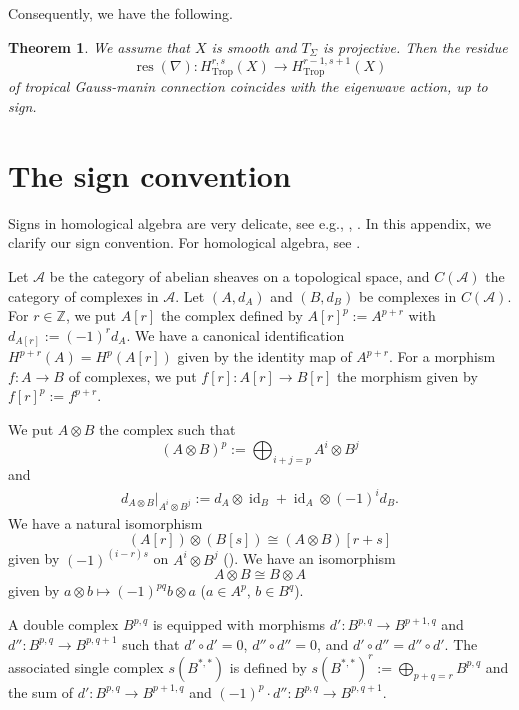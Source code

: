 \documentclass[12pt,a4]{amsart}
\newtheorem{thm}{Theorem}[section]
\def\Z{\mathbb{Z}}
\def\res{\mathop{\mathrm{res}}\nolimits}
\def\Trop{\mathop{\mathrm{trop}}\nolimits}
\def\id{\mathop{\mathrm{id}}\nolimits}
\def\Trop{\mathop{\mathrm{Trop}}\nolimits}
\numberwithin{equation}{section}
\numberwithin{figure}{section}
\begin{document}
   Consequently, we have the following.
  \begin{thm}\label{eigenwave is residue of GM connections:label}
   We assume that $X$ is smooth and $T_{\Sigma}$ is projective.
   Then the residue 
   $$ \res (\nabla)  
      \colon 
     H^{r,s}_{\Trop} ( X)
      \to   
      H^{r-1,s+1}_{\Trop} ( X) 
   $$
    of tropical Gauss-manin connection
   coincides with the eigenwave action, up to sign.
  \end{thm}


\appendix
\section{The sign convention} \label{sec:sign_convention}
   Signs in homological algebra are very delicate, see e.g.,  
   \cite{ConradGrothendieckDualityandBaseChange2000},
    \cite{LawsonInwhichItrytogetthesignsrightforonce2013}. 
   In this appendix, 
   we clarify our sign convention.
   For homological algebra, see \cite{WeibelAnintroductiontohomologicalalgebra1984}. 
   
  Let $\mathscr{A}$ be the category of abelian sheaves on a topological space,
   and $C(\mathscr{A})$ the category of complexes in $\mathscr{A}$.
  Let $(A,d_A)$ and $(B,d_B)$ be complexes in $C(\mathscr{A})$.
  For  $r \in \Z$,
   we put $A[r]$ the complex defined by
   $A[r]^p:= A^{p+r}$ with $d_{A[r]} := (-1)^{r} d_A$.
  We have a canonical identification $H^{p+r}(A) = H^{p}(A[r])$ 
   given by the identity map of $A^{p+r}$.
  For a morphism $f \colon A \to B$ of complexes, 
   we put  $f[r] \colon A[r] \to B[r]$ 
   the morphism given by $f[r]^p := f^{p+r}$.

  We put $A \otimes B$ the complex 
   such that 
   $$ (A \otimes B)^p := \bigoplus_{i+j =p} A^i \otimes B^j$$
   and 
   \begin{align}\label{eq sign of tensor product}
    d_{A \otimes B} |_{ A^i \otimes B^j }
      := d_A \otimes \id_B + \id_A \otimes (-1)^i d_B   .
   \end{align}
   We have a natural isomorphism 
   $$ (A[r]) \otimes (B[s]) \cong (A \otimes B) [r+s]$$
   given by 
   $(-1)^{(i-r) s}$ on $A^i \otimes B^j$ (\cite[p.11 and p.15]{ConradGrothendieckDualityandBaseChange2000}).
   We have an isomorphism 
     $$ A \otimes B \cong B \otimes A$$
     given by 
     $ a \otimes b \mapsto (-1)^{pq} b \otimes a$
     ($a \in A^p $, $b \in B^q$).

   A double complex $B^{p,q}$
    is equipped with morphisms
     $d' \colon B^{p,q} \to B^{p+1, q}$
     and 
     $d'' \colon B^{p,q} \to B^{p, q+1}$
     such that 
     $d' \circ d' = 0$,
     $d'' \circ d'' = 0$, and 
     $d' \circ d'' = d'' \circ d' $.
  The associated single complex $s(B^{ *,* })$
  is defined by 
    $ s(B^{*,*})^r := \bigoplus_{ p+q = r } B^{p,q}$
    and the sum of 
     $d' \colon B^{p,q} \to B^{p+1, q}$
     and 
     $(-1)^p \cdot d'' \colon B^{p,q} \to B^{p, q+1}$.
\end{document}
